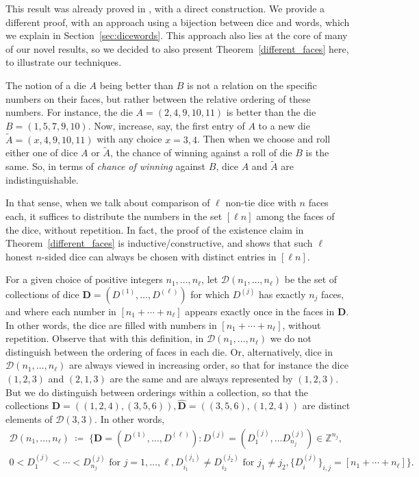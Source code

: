 \documentclass[reqno,a4paper,11pt]{amsart}
\theoremstyle{remark}
\newcommand{\mc}[1]{{\mathcal #1}}
\newcommand{\mb}[1]{{\mathbf #1}}
\numberwithin{equation}{section}
\begin{document}
This result was already proved in \cite[Theorem~2.1]{Schaefer}, with a direct construction. We provide a different proof, with an approach using a bijection between dice and words, which we explain in Section~\ref{sec:dicewords}. This approach also lies at the core of many of our novel results, so we decided to also present Theorem~\ref{different_faces} here, to illustrate our techniques.

The notion of a die $A$ being better than $B$ is not a relation on the specific numbers on their faces, but rather between the relative ordering of these numbers. For instance, the die $A=(2,4,9,10,11)$ is better than the die $B=(1,5,7,9,10)$. Now, increase, say, the first entry of $A$ to a new die $\widetilde A=(x,4,9,10,11)$ with any choice $x={3,4}$. Then when we choose and roll either one of dice $A$ or $\widetilde A$, the chance of winning against a roll of die $B$ is the same. So, in terms of \textit{chance of winning} against $B$, dice $A$ and $\widetilde A$ are indistinguishable.

In that sense, when we talk about comparison of $\ell$ non-tie dice with $n$ faces each, it suffices to distribute the numbers in the set $[\ell n]$ among the faces of the dice, without repetition. In fact, the proof of the existence claim in Theorem~\ref{different_faces} is inductive/constructive, and shows that such $\ell$ honest $n$-sided dice can always be chosen with distinct entries in $[\ell n]$.

For a given choice of positive integers $n_1,\hdots,n_\ell$, let $\mc D(n_1,\hdots, n_\ell)$ be the set of collections of dice $\mb D=(D^{(1)},\hdots, D^{(\ell)})$ for which
$D^{(j)}$ has exactly $n_j$ faces, and where each number in $[n_1+\cdots +n_\ell]$ appears exactly once in the faces in $\mb D$. In other words, the dice are filled with numbers in $[n_1+\cdots +n_\ell]$, without repetition. Observe that with this definition, in $\mc D(n_1,\hdots, n_\ell)$ we do not distinguish between the ordering of faces in each die. Or, alternatively, dice in $\mc D(n_1,\hdots, n_\ell)$ are always viewed in increasing order, so that for instance the dice $(1,2,3)$ and $(2,1,3)$ are the same and are always represented by $(1,2,3)$. But we do distinguish between orderings within a collection, so that the collections $\mb D=((1,2,4),(3,5,6)),\widehat{\mb D}=((3,5,6),(1,2,4))$ are distinct elements of $\mc D(3,3)$.  In other words,
%
\begin{multline*}
\mc D(n_1,\hdots, n_\ell)\;\coloneqq\; \Big\{
\mb D=(D^{(1)},\hdots, D^{(\ell)}): D^{(j)}=(D^{(j)}_1,\hdots D^{(j)}_{n_j})\in \mathbb Z^{n_j}, \\ 0<D^{(j)}_1<\cdots<D^{(j)}_{n_j} \text{ for } j=1,\hdots,\ell,
D^{(j_1)}_{i_1}\neq D^{(j_2)}_{i_2} \text{ for }j_1\neq j_2, \{D^{(j)}_i\}_{i,j}=[n_1+\cdots+n_\ell]
\Big\}.
\end{multline*}
\end{document}
